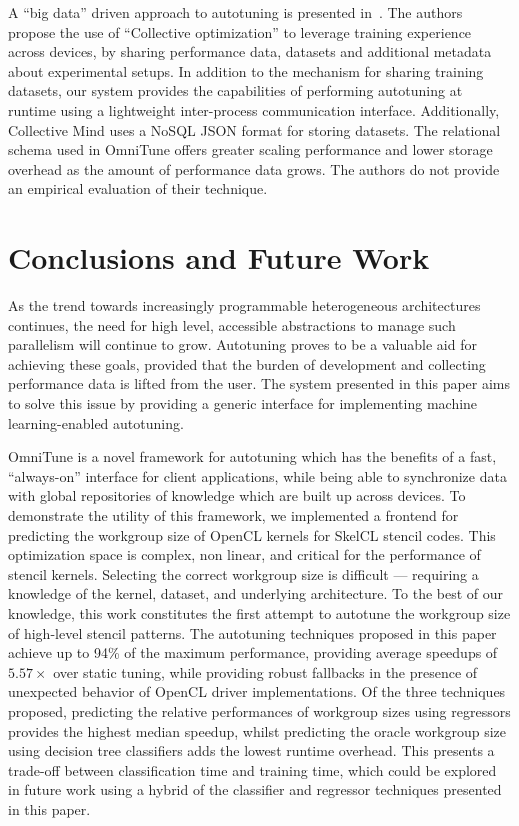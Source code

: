 
A ``big data'' driven approach to autotuning is presented
in~\cite{Fursin2014}. The authors propose the use of ``Collective
optimization'' to leverage training experience across devices, by
sharing performance data, datasets and additional metadata about
experimental setups. In addition to the mechanism for sharing training
datasets, our system provides the capabilities of performing
autotuning at runtime using a lightweight inter-process communication
interface. Additionally, Collective Mind uses a NoSQL JSON format for
storing datasets. The relational schema used in OmniTune offers
greater scaling performance and lower storage overhead as the amount
of performance data grows. The authors do not provide an empirical
evaluation of their technique.


\section{Conclusions and Future Work}\label{sec:conclusions}

As the trend towards increasingly programmable heterogeneous
architectures continues, the need for high level, accessible
abstractions to manage such parallelism will continue to
grow. Autotuning proves to be a valuable aid for achieving these
goals, provided that the burden of development and collecting
performance data is lifted from the user. The system presented in this
paper aims to solve this issue by providing a generic interface for
implementing machine learning-enabled autotuning.

OmniTune is a novel framework for autotuning which has the benefits of
a fast, ``always-on'' interface for client applications, while being
able to synchronize data with global repositories of knowledge which
are built up across devices. To demonstrate the utility of this
framework, we implemented a frontend for predicting the workgroup size
of OpenCL kernels for SkelCL stencil codes. This optimization space is
complex, non linear, and critical for the performance of stencil
kernels.  Selecting the correct workgroup size is difficult ---
requiring a knowledge of the kernel, dataset, and underlying
architecture. To the best of our knowledge, this work constitutes the
first attempt to autotune the workgroup size of high-level stencil
patterns. The autotuning techniques proposed in this paper achieve up
to 94\% of the maximum performance, providing average speedups of
$5.57\times$ over static tuning, while providing robust fallbacks in
the presence of unexpected behavior of OpenCL driver
implementations. Of the three techniques proposed, predicting the
relative performances of workgroup sizes using regressors provides the
highest median speedup, whilst predicting the oracle workgroup size
using decision tree classifiers adds the lowest runtime overhead. This
presents a trade-off between classification time and training time,
which could be explored in future work using a hybrid of the
classifier and regressor techniques presented in this paper.

